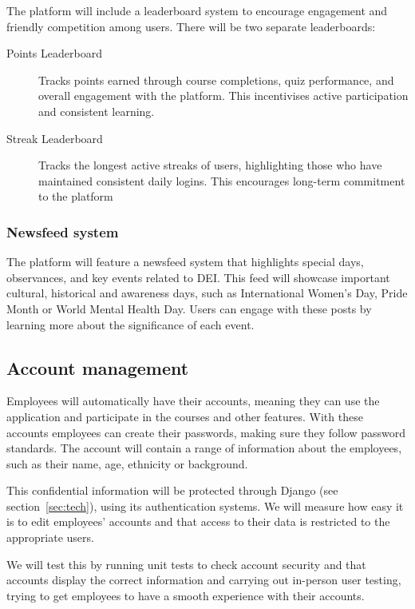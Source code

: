\documentclass{scrartcl}
\begin{document}
The platform will include a leaderboard system to encourage engagement and friendly competition among users.
There will be two separate leaderboards:

\begin{description}
\item[Points Leaderboard] Tracks points earned through course completions, quiz performance, and overall engagement with the platform. This incentivises active participation and consistent learning.
\item[Streak Leaderboard] Tracks the longest active streaks of users, highlighting those who have maintained consistent daily logins. This encourages long-term commitment to the platform
\end{description}

\subsubsection{Newsfeed system}

The platform will feature a newsfeed system that highlights special days, observances, and key events related to DEI. This feed will showcase important cultural, historical and awareness days, such as International Women’s Day, Pride Month or World Mental Health Day. Users can engage with these posts by learning more about the significance of each event.

\subsection{Account management}
Employees will automatically have their accounts, meaning they can use the application and participate in the courses and other features.
With these accounts employees can create their passwords, making sure they follow password standards.
The account will contain a range of information about the employees, such as their name, age, ethnicity or background.

\par
This confidential information will be protected through Django \parencite{django} (see section~\ref{sec:tech}), using its authentication systems.
We will measure how easy it is to edit employees' accounts and that access to their data is restricted to the appropriate users.

\par
We will test this by running unit tests to check account security and that accounts display the correct information and carrying out in-person user testing, trying to get employees to have a smooth experience with their accounts.
\end{document}
